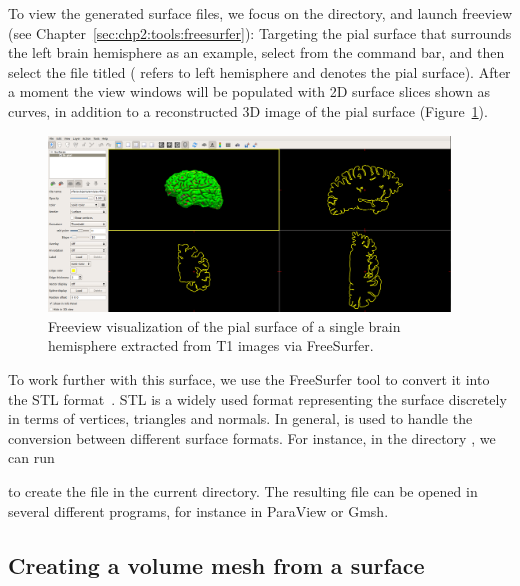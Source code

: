 To view the generated surface files, we focus on the 
directory, and launch freeview (see
Chapter~\ref{sec:chp2:tools:freesurfer}):
\noindent Targeting the pial surface that surrounds the left brain
hemisphere as an example, select 
from the command bar, and then select the file titled 
( refers to left hemisphere and  denotes the pial
surface). After a moment the view windows will be populated with 2D
surface slices shown as curves, in addition to a reconstructed 3D
image of the pial surface (Figure~\ref{fig:chp3:freeview-scr}).
\begin{figure}%
  \centering
  \includegraphics[width=0.95\textwidth]{./chapters/chp3/FIG/freeviewexscr}
  \caption{Freeview visualization of the pial surface of a single
    brain hemisphere extracted from T1 images via FreeSurfer.}
  \label{fig:chp3:freeview-scr}
\end{figure}

To work further with this surface, we use the FreeSurfer tool
 to convert it into the STL
format~\cite{roscoe1988stereolithography}. STL is a widely used format
representing the surface discretely in terms of vertices, triangles
and normals. In general,  is used to handle the
conversion between different surface formats. For instance, in the
directory , we can run


\noindent to create the file  in the current
directory. The resulting file can be opened in several different
programs, for instance in ParaView or Gmsh.

\subsection{Creating a volume mesh from a surface}
\label{subsec:chp3:mesh-creation}

